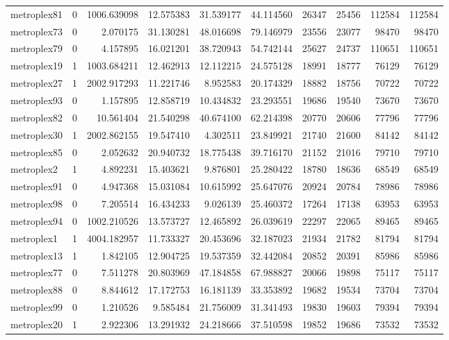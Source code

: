 \begin{longtable}{|l|r|r|r|r|r|r|r|r|r|}
metroplex81 & 0 & 1006.639098 & 12.575383 & 31.539177 & 44.114560 & 26347 & 25456 & 112584 & 112584 \\
metroplex73 & 0 & 2.070175 & 31.130281 & 48.016698 & 79.146979 & 23556 & 23077 & 98470 & 98470 \\
metroplex79 & 0 & 4.157895 & 16.021201 & 38.720943 & 54.742144 & 25627 & 24737 & 110651 & 110651 \\
metroplex19 & 1 & 1003.684211 & 12.462913 & 12.112215 & 24.575128 & 18991 & 18777 & 76129 & 76129 \\
metroplex27 & 1 & 2002.917293 & 11.221746 & 8.952583 & 20.174329 & 18882 & 18756 & 70722 & 70722 \\
metroplex93 & 0 & 1.157895 & 12.858719 & 10.434832 & 23.293551 & 19686 & 19540 & 73670 & 73670 \\
metroplex82 & 0 & 10.561404 & 21.540298 & 40.674100 & 62.214398 & 20770 & 20606 & 77796 & 77796 \\
metroplex30 & 1 & 2002.862155 & 19.547410 & 4.302511 & 23.849921 & 21740 & 21600 & 84142 & 84142 \\
metroplex85 & 0 & 2.052632 & 20.940732 & 18.775438 & 39.716170 & 21152 & 21016 & 79710 & 79710 \\
metroplex2 & 1 & 4.892231 & 15.403621 & 9.876801 & 25.280422 & 18780 & 18636 & 68549 & 68549 \\
metroplex91 & 0 & 4.947368 & 15.031084 & 10.615992 & 25.647076 & 20924 & 20784 & 78986 & 78986 \\
metroplex98 & 0 & 7.205514 & 16.434233 & 9.026139 & 25.460372 & 17264 & 17138 & 63953 & 63953 \\
metroplex94 & 0 & 1002.210526 & 13.573727 & 12.465892 & 26.039619 & 22297 & 22065 & 89465 & 89465 \\
metroplex1 & 1 & 4004.182957 & 11.733327 & 20.453696 & 32.187023 & 21934 & 21782 & 81794 & 81794 \\
metroplex13 & 1 & 1.842105 & 12.904725 & 19.537359 & 32.442084 & 20852 & 20391 & 85986 & 85986 \\
metroplex77 & 0 & 7.511278 & 20.803969 & 47.184858 & 67.988827 & 20066 & 19898 & 75117 & 75117 \\
metroplex88 & 0 & 8.844612 & 17.172753 & 16.181139 & 33.353892 & 19682 & 19534 & 73704 & 73704 \\
metroplex99 & 0 & 1.210526 & 9.585484 & 21.756009 & 31.341493 & 19830 & 19603 & 79394 & 79394 \\
metroplex20 & 1 & 2.922306 & 13.291932 & 24.218666 & 37.510598 & 19852 & 19686 & 73532 & 73532 \\

\end{longtable}
